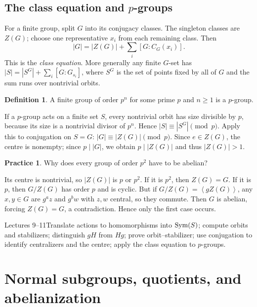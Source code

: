 \documentclass[11pt,openany]{book}
\newcommand{\angles}[1]{\left\langle#1\right\rangle}
\theoremstyle{definition}
\newtheorem{definition}[theorem]{Definition}
\newtheorem{exercise}[theorem]{Practice}
\begin{document}
\section{The class equation and $p$-groups}
For a finite group, split $G$ into its conjugacy classes. The singleton classes are $Z(G)$; choose one representative $x_i$ from each remaining class. Then
\[|G|=|Z(G)|+\sum_i[G:C_G(x_i)].\]
This is the \emph{class equation}. More generally any finite $G$-set has $|S|=|S^G|+\sum_i[G:G_{s_i}]$, where $S^G$ is the set of points fixed by all of $G$ and the sum runs over nontrivial orbits.
\begin{definition}A finite group of order $p^n$ for some prime $p$ and $n\ge1$ is a $p$-group.\end{definition}
If a $p$-group acts on a finite set $S$, every nontrivial orbit has size divisible by $p$, because its size is a nontrivial divisor of $p^n$. Hence $|S|\equiv |S^G|\pmod p$. Apply this to conjugation on $S=G$: $|G|\equiv|Z(G)|\pmod p$. Since $e\in Z(G)$, the centre is nonempty; since $p\mid |G|$, we obtain $p\mid |Z(G)|$ and thus $|Z(G)|>1$.
\begin{exercise}Why does every group of order $p^2$ have to be abelian?\end{exercise}
\begin{solution}Its centre is nontrivial, so $|Z(G)|$ is $p$ or $p^2$. If it is $p^2$, then $Z(G)=G$. If it is $p$, then $G/Z(G)$ has order $p$ and is cyclic. But if $G/Z(G)=\angles{gZ(G)}$, any $x,y\in G$ are $g^az$ and $g^bw$ with $z,w$ central, so they commute. Then $G$ is abelian, forcing $Z(G)=G$, a contradiction. Hence only the first case occurs.\end{solution}
\begin{checkpoint}{Lectures 9--11}Translate actions to homomorphisms into $\operatorname{Sym}(S)$; compute orbits and stabilizers; distinguish $gH$ from $Hg$; prove orbit--stabilizer; use conjugation to identify centralizers and the centre; apply the class equation to $p$-groups.\end{checkpoint}


\chapter{Normal subgroups, quotients, and abelianization}
\end{document}
